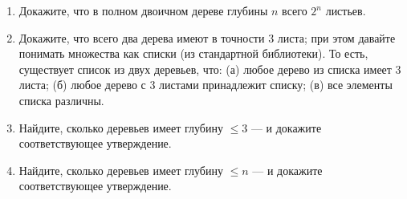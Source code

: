 \documentclass[10pt,a4paper,oneside]{article}
\begin{document}
\begin{enumerate}
\begin{enumerate}
\item Докажите, что в полном двоичном дереве глубины $n$ всего $2^n$ листьев. 
\item Докажите, что всего два дерева имеют в точности 3 листа; при этом давайте
понимать множества как списки (из стандартной библиотеки). То есть, существует
список из двух деревьев, что: (а) любое дерево из списка имеет 3 листа; (б)
любое дерево с 3 листами принадлежит списку; (в) все элементы списка различны.
\item Найдите, сколько деревьев имеет глубину $\le 3$ --- и докажите соответствующее утверждение.
\item Найдите, сколько деревьев имеет глубину $\le n$ --- и докажите соответствующее утверждение.
\end{enumerate}

\end{enumerate}
\end{document}

